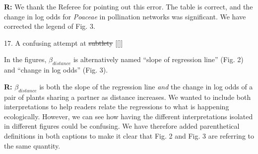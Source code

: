 \documentclass[12pt]{letter}
\newenvironment{refquote}{\bigskip \begin{it}}{\end{it}\smallskip}
\providecommand{\DIFadd}[1]{{\protect\color{blue}\uwave{#1}}} %
\providecommand{\DIFdel}[1]{{\protect\color{red}\sout{#1}}}                      %
\providecommand{\DIFaddbegin}{} %
\providecommand{\DIFaddend}{} %
\providecommand{\DIFdelbegin}{} %
\providecommand{\DIFdelend}{} %
\newcommand{\DIFscaledelfig}{0.5}
\newlength{\DIFdelgraphicswidth} %
\newlength{\DIFdelgraphicsheight} %
\newcommand{\DIFaddincludegraphics}[2][]{{\color{blue}\fbox{\DIFOincludegraphics[#1]{#2}}}} %
\newcommand{\DIFdelincludegraphics}[2][]{%
\sbox{\DIFdelgraphicsbox}{\DIFOincludegraphics[#1]{#2}}%
\settoboxwidth{\DIFdelgraphicswidth}{\DIFdelgraphicsbox} %
\settoboxtotalheight{\DIFdelgraphicsheight}{\DIFdelgraphicsbox} %
\scalebox{\DIFscaledelfig}{%
\parbox[b]{\DIFdelgraphicswidth}{\usebox{\DIFdelgraphicsbox}\\[-\baselineskip] \rule{\DIFdelgraphicswidth}{0em}}\llap{\resizebox{\DIFdelgraphicswidth}{\DIFdelgraphicsheight}{%
\setlength{\unitlength}{\DIFdelgraphicswidth}%
\begin{picture}(1,1)%
\thicklines\linethickness{2pt} %
{\color[rgb]{1,0,0}\put(0,0){\framebox(1,1){}}}%
{\color[rgb]{1,0,0}\put(0,0){\line( 1,1){1}}}%
{\color[rgb]{1,0,0}\put(0,1){\line(1,-1){1}}}%
\end{picture}%
}\hspace*{3pt}}} %
} %
\DeclareRobustCommand{\DIFaddbegin}{\DIFOaddbegin \let\includegraphics\DIFaddincludegraphics} %
\DeclareRobustCommand{\DIFaddend}{\DIFOaddend \let\includegraphics\DIFOincludegraphics} %
\DeclareRobustCommand{\DIFdelbegin}{\DIFOdelbegin \let\includegraphics\DIFdelincludegraphics} %
\DeclareRobustCommand{\DIFdelend}{\DIFOaddend \let\includegraphics\DIFOincludegraphics} %
\begin{document}
	\textbf{R:} We thank the Referee for pointing out this error. The table is correct, and the change in log odds for \emph{Poaceae} in pollination networks was significant. We have corrected the legend of Fig. 3.


17. A confusing attempt at \DIFdelbegin \DIFdel{subtlety
}\DIFdelend \DIFaddbegin \DIFadd{subtelty }[[\DIFadd{done}]]
\DIFaddend 

	\begin{refquote}
		In the figures, $\beta_{distance}$ is alternatively named “slope of regression line” (Fig. 2) and “change in log odds” (Fig. 3).
	\end{refquote}


	\textbf{R:} $\beta_{distance}$ is both the slope of the regression line \emph{and} the change in log odds of a pair of plants sharing a partner as distance increases. We wanted to include both interpretations to help readers relate the regressions to what is happening ecologically. However, we can see how having the different interpretations isolated in different figures could be confusing. We have therefore added parenthetical definitions in both captions to make it clear that Fig. 2 and Fig. 3 are referring to the same quantity.






\end{document}
